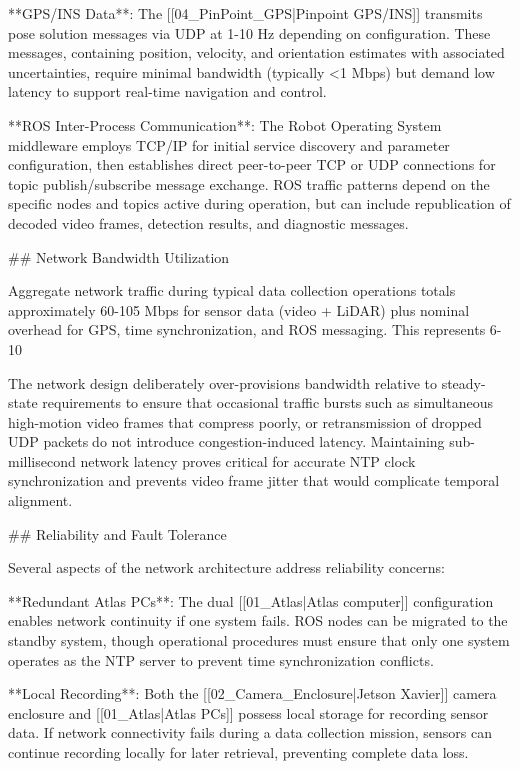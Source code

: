 \documentclass{erauthesis}
\begin{document}
**GPS/INS Data**: The [[04_PinPoint_GPS|Pinpoint GPS/INS]] transmits pose solution messages via UDP at 1-10 Hz depending on configuration. These messages, containing position, velocity, and orientation estimates with associated uncertainties, require minimal bandwidth (typically <1 Mbps) but demand low latency to support real-time navigation and control.



**ROS Inter-Process Communication**: The Robot Operating System middleware employs TCP/IP for initial service discovery and parameter configuration, then establishes direct peer-to-peer TCP or UDP connections for topic publish/subscribe message exchange. ROS traffic patterns depend on the specific nodes and topics active during operation, but can include republication of decoded video frames, detection results, and diagnostic messages.

## Network Bandwidth Utilization

Aggregate network traffic during typical data collection operations totals approximately 60-105 Mbps for sensor data (video + LiDAR) plus nominal overhead for GPS, time synchronization, and ROS messaging. This represents 6-10%

The network design deliberately over-provisions bandwidth relative to steady-state requirements to ensure that occasional traffic burstssuch as simultaneous high-motion video frames that compress poorly, or retransmission of dropped UDP packetsdo not introduce congestion-induced latency. Maintaining sub-millisecond network latency proves critical for accurate NTP clock synchronization and prevents video frame jitter that would complicate temporal alignment.

## Reliability and Fault Tolerance

Several aspects of the network architecture address reliability concerns:

**Redundant Atlas PCs**: The dual [[01_Atlas|Atlas computer]] configuration enables network continuity if one system fails. ROS nodes can be migrated to the standby system, though operational procedures must ensure that only one system operates as the NTP server to prevent time synchronization conflicts.

**Local Recording**: Both the [[02_Camera_Enclosure|Jetson Xavier]] camera enclosure and [[01_Atlas|Atlas PCs]] possess local storage for recording sensor data. If network connectivity fails during a data collection mission, sensors can continue recording locally for later retrieval, preventing complete data loss.
\end{document}
